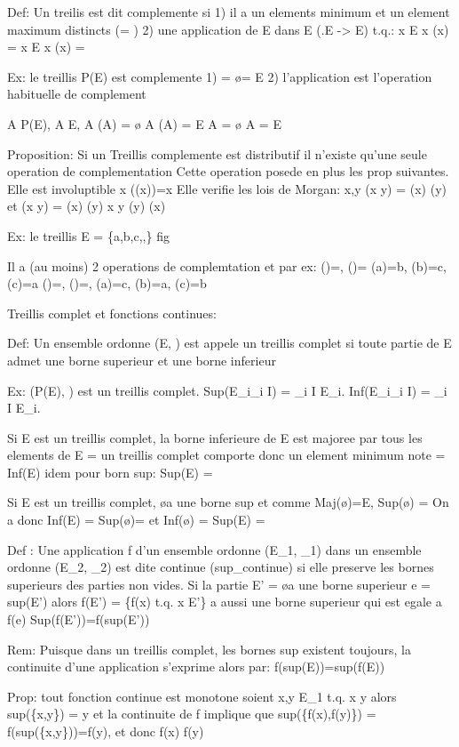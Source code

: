 \documentclass{article}
\begin{document}
Def: Un treilis est dit complemente si
1) il a un elements minimum \bot et un element maximum \top distincts (\bot \not= \top)
2) \exists une application \mu de E dans E (\mu.E -> E) t.q.:
\forall x \in E x \sqcap \mu(x) = \bot
\forall x \in E x \sqcup \mu(x) = \top

Ex: le treillis P(E) est complemente
1) \bot = \o \top = E
2) l'application \mu est l'operation habituelle de complement

\forall A \in P(E), A \subseteq E, A \sqcap \mu(A) = \o
A \sqcup \mu(A) = E
A \sqcap {} = \o
A \sqcup {} = E


Proposition: Si un Treillis complemente est distributif il n'existe qu'une seule operation de complementation \mu
Cette operation posede en plus les prop suivantes.
Elle est involuptible \forall x \mu(\mu(x))=x
Elle verifie les lois de Morgan:
\forall x,y \mu(x \sqcup y) = \mu(x) \sqcap \mu(y)
		et  \mu(x \sqcap y) = \mu(x) \sqcup \mu(y)
x \leq y \leftrightarrow \mu(y) \leq \mu(x)

Ex: le treillis E = \{a,b,c,\bot,\top\}
fig 

Il a (au moins) 2 operations de complemtation \mu et \Mu
par ex: \mu(\top)=\bot, \mu(\bot)=\top
\mu(a)=b, \mu(b)=c, \mu(c)=a
\Mu(\top)=\bot, \Mu(\bot)=\top, \mu(a)=c, \mu(b)=a, \mu(c)=b


Treillis complet et fonctions continues:

Def: Un ensemble ordonne (E, \leq) est appele un treillis complet si toute partie de E admet une borne superieur et une borne inferieur

Ex: (P(E), \subseteq) est un treillis complet. 
Sup({E_i}_{i \in I}) = \cup_{i \in I} E_i.
Inf({E_i}_{i \in I}) = \cap_{i \in I} E_i.

Si E est un treillis complet, la borne inferieure de E est majoree par tous les elements de E = un treillis complet comporte donc un element minimum note \bot
\bot = Inf(E)
idem pour born sup: \top
Sup(E) = \top

Si E est un treillis complet, \o a une borne sup et comme Maj(\o)=E, Sup(\o) = \bot
On a donc Inf(E) = Sup(\o)=\bot
et Inf(\o) = Sup(E) = \top

Def : Une application f d'un ensemble ordonne (E_1, \leq_1) dans un ensemble ordonne (E_2, \leq_2) est dite continue (sup_continue) si elle preserve les bornes superieurs des parties non vides.
Si la partie E' \not= \o a une borne superieur e = sup(E') alors f(E') = \{f(x) t.q. x \in E'\} a aussi une borne superieur qui est egale a f(e)
Sup(f(E'))=f(sup(E'))

Rem: Puisque dans un treillis complet, les bornes sup existent toujours, la continuite d'une application s'exprime alors par:
	f(sup(E))=sup(f(E))

Prop: tout fonction continue est monotone
soient x,y \in E_1 t.q. x \leq y
alors sup(\{x,y\}) = y et la continuite de f implique que sup(\{f(x),f(y)\}) = f(sup(\{x,y\}))=f(y), et donc f(x) \leq f(y)
\end{document}
